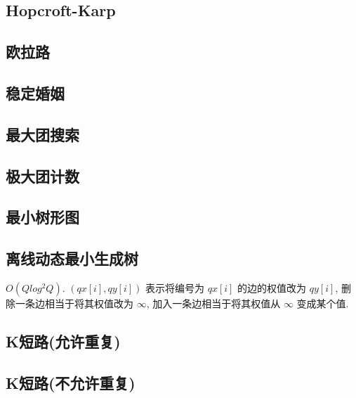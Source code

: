 \documentclass[landscape, twocolumn, 8pt, a4paper, twoside]{extarticle}
\begin{document}
  \subsection{Hopcroft-Karp}
    

  \subsection{欧拉路}
    

  \subsection{稳定婚姻}
    

  \subsection{最大团搜索}
    
  
  \subsection{极大团计数}
    

  \subsection{最小树形图}
    

  \subsection{离线动态最小生成树}
    $O (Q log^2 Q) $.
    $(qx[i], qy[i])$ 表示将编号为 $qx[i]$ 的边的权值改为 $qy[i]$,
    删除一条边相当于将其权值改为 $\infty$,
    加入一条边相当于将其权值从 $\infty$ 变成某个值.
    

  \subsection{K短路(允许重复)}
    

  \subsection{K短路(不允许重复)}
    
  
\end{document}
